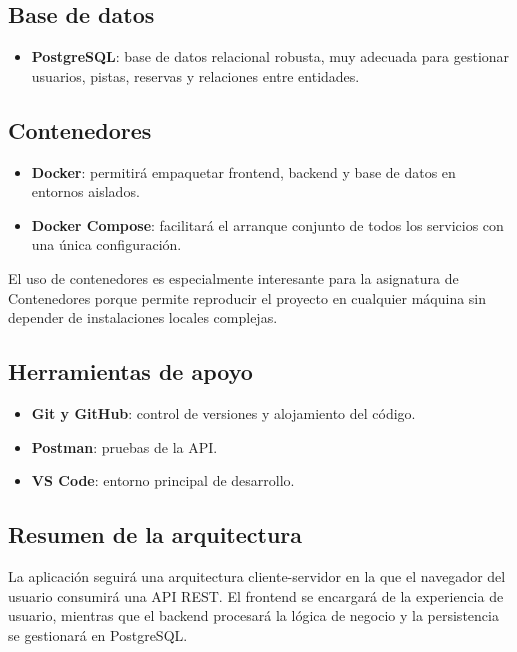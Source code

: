 \documentclass[12pt,a4paper]{article}
\begin{document}
\subsection{Base de datos}
\begin{itemize}[leftmargin=*]
    \item \textbf{PostgreSQL}: base de datos relacional robusta, muy adecuada para gestionar usuarios, pistas, reservas y relaciones entre entidades.
\end{itemize}

\subsection{Contenedores}
\begin{itemize}[leftmargin=*]
    \item \textbf{Docker}: permitirá empaquetar frontend, backend y base de datos en entornos aislados.
    \item \textbf{Docker Compose}: facilitará el arranque conjunto de todos los servicios con una única configuración.
\end{itemize}

El uso de contenedores es especialmente interesante para la asignatura de Contenedores porque permite reproducir el proyecto en cualquier máquina sin depender de instalaciones locales complejas.

\subsection{Herramientas de apoyo}
\begin{itemize}[leftmargin=*]
    \item \textbf{Git y GitHub}: control de versiones y alojamiento del código.
    \item \textbf{Postman}: pruebas de la API.
    \item \textbf{VS Code}: entorno principal de desarrollo.
\end{itemize}

\subsection{Resumen de la arquitectura}
La aplicación seguirá una arquitectura cliente-servidor en la que el navegador del usuario consumirá una API REST. El frontend se encargará de la experiencia de usuario, mientras que el backend procesará la lógica de negocio y la persistencia se gestionará en PostgreSQL.
\end{document}
